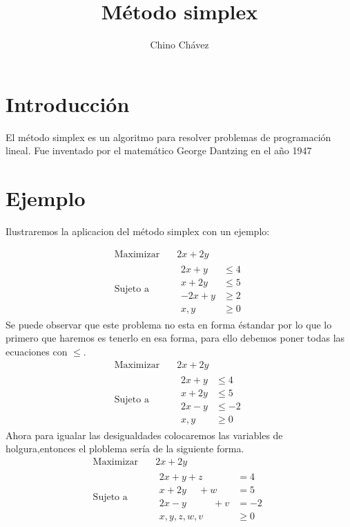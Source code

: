 \documentclass{article}
\title{Método simplex}
\author{Chino Chávez}
\begin{document}
\maketitle
\section{Introducción}
\label{sec:introduccion}

El método simplex es un algoritmo para resolver problemas de
programación lineal. Fue inventado por el matemático George Dantzing
en el año 1947
\section{Ejemplo}
\label{sec:ejemplo}

Ilustraremos la aplicacion del método simplex con un ejemplo:

\begin{equation*}
  \begin{aligned}
\text{Maximizar} \quad & 2x+2y\\
\text{Sujeto a} \quad &
   \begin{aligned}
2x+y &\leq 4\\
x+2y &\leq 5\\
-2x+y &\geq 2\\
x,y &\geq 0
   \end{aligned}
\end{aligned}
\end{equation*}
Se puede observar que este problema no esta en forma éstandar por lo
que lo primero que haremos es tenerlo en esa forma, para ello debemos
poner todas las ecuaciones con $\leq$.
\begin{equation*}
  \begin{aligned}
\text{Maximizar} \quad & 2x+2y\\
\text{Sujeto a} \quad &
   \begin{aligned}
2x+y &\leq 4\\
x+2y &\leq 5\\
2x-y &\leq -2\\
x,y &\geq 0
   \end{aligned}
\end{aligned}
\end{equation*}
Ahora para igualar las desigualdades colocaremos las variables de
holgura,entonces el ploblema sería de la siguiente forma.
\begin{equation*}
  \begin{aligned}
\text{Maximizar} \quad & 2x+2y\\
\text{Sujeto a} \quad &
   \begin{aligned}
     2x+y+z\phantom{+w}\phantom{+v} &= 4\\
x+2y\phantom{+z}+w\phantom{+v} &= 5\\
2x-y\phantom{+z}\phantom{+w}+v &= -2\\
x,y,z,w,v &\geq 0
 \end{aligned}
\end{aligned}
\end{equation*}
\end{document}

